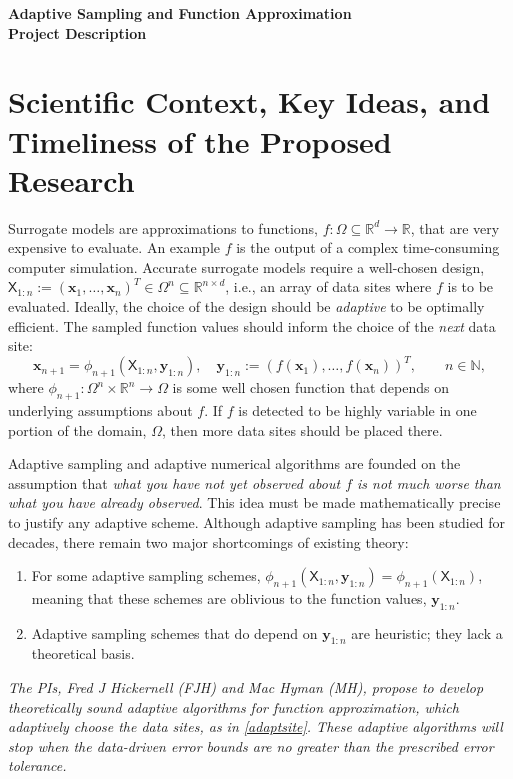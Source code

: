 \documentclass[11pt]{NSFamsart}
\newcommand{\reals}{{\mathbb{R}}}
\newcommand{\naturals}{{\mathbb{N}}}
\newcommand{\mX}{\mathsf{X}}
\newcommand{\bx}{{\boldsymbol{x}}}
\newcommand{\by}{{\boldsymbol{y}}}
\newcommand{\shortnoy}{For some adaptive sampling schemes, $\phi_{n+1}(\mX_{1:n},\by_{1:n}) = \phi_{n+1}(\mX_{1:n})$, meaning that these schemes are oblivious to the function values, $\by_{1:n}$.}
\newcommand{\shortheuristic}{Adaptive sampling schemes that do depend on $\by_{1:n}$ are heuristic; they lack a theoretical basis.}
\begin{document}

\begin{center}
\Large \textbf{Adaptive Sampling and Function Approximation \\ Project Description}
\end{center}
\vspace{-2ex}

\setcounter{tocdepth}{1}
\tableofcontents

\vspace{-6ex}

\section{Scientific Context, Key Ideas, and Timeliness of the Proposed Research}
Surrogate models are approximations to functions, $f: \Omega \subseteq \reals^d \to \reals$, that are very expensive to evaluate.  An example $f$ is the output of a complex time-consuming computer simulation.  Accurate surrogate models require a well-chosen design, $\mX_{1:n} := (\bx_1, \ldots, \bx_n)^T \in \Omega^{n} \subseteq \reals^{n \times d}$, i.e., an array of data sites where $f$ is to be evaluated.  Ideally, the choice of the design should be \emph{adaptive} to be optimally efficient.  The sampled function values should inform the choice of the \emph{next} data site: 
\begin{equation} \label{adaptsite}
    \bx_{n+1} = \phi_{n+1}(\mX_{1:n},\by_{1:n}), \quad \by_{1:n} := (f(\bx_1), \ldots, f(\bx_n))^T, \qquad n \in \naturals,
\end{equation}
where $\phi_{n+1} : \Omega^{n} \times \reals^n \to \Omega$ is some well chosen function that depends on underlying assumptions about $f$.  If $f$ is detected to be highly variable in one portion of the domain, $\Omega$, then more data sites should be placed there. 

Adaptive sampling and adaptive numerical algorithms are founded on the assumption that \emph{what you have not yet observed about $f$ is not much worse than what you have already observed}.  This idea must be made mathematically precise to justify any adaptive scheme.  Although adaptive sampling has been studied for decades, there remain two major shortcomings of existing theory:
\begin{enumerate}[widest = Shortcomingj, leftmargin =*]
\renewcommand{\labelenumi}{Shortcoming \arabic{enumi}.}
    \item \shortnoy \label{shortcomenoy}
    
    \item \shortheuristic
    
\end{enumerate}
\emph{The PIs, Fred J Hickernell (FJH) and Mac Hyman (MH), propose to develop theoretically sound adaptive algorithms for function approximation, which adaptively choose the data sites, as in \eqref{adaptsite}.  These adaptive algorithms will stop when the data-driven error bounds are no greater than the prescribed error tolerance.}
\end{document}
